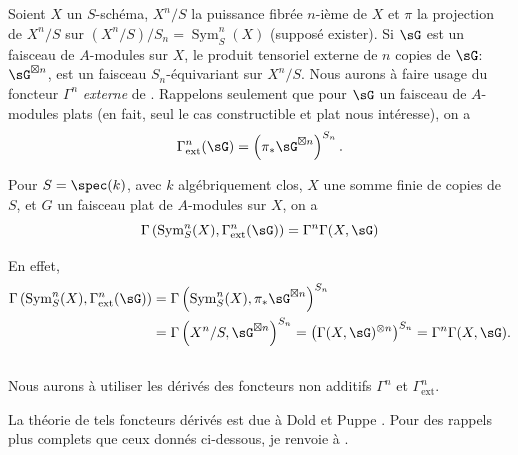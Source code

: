 \subsection{}\label{III:1-2}

Soient $X$ un $S$-schéma, $X^n/S$ la puissance fibrée $n$-ième de $X$ et 
$\pi$ la projection de $X^n/S$ sur $(X^n/S)/S_n=\operatorname{Sym}_S^n(X)$ 
(supposé exister). Si $\sG$ est un faisceau de $A$-modules sur $X$, le 
produit tensoriel externe de $n$ copies de $\sG$: $\sG^{\boxtimes n}$, est un 
faisceau $S_n$-équivariant sur $X^n/S$. Nous aurons à faire usage du 
foncteur $\Gamma^n$ \emph{externe} de . Rappelons 
seulement que pour $\sG$ un faisceau de $A$-modules plats (en fait, seul le cas 
constructible et plat nous intéresse), on a 
\[
  \Gamma_\text{ext}^n(\sG) = \left(\pi_*\sG^{\boxtimes n}\right)^{S_n} \text{.}
\]





\begin{lemma_}\label{III:1-3}
Pour $S=\spec(k)$, avec $k$ algébriquement clos, $X$ une somme finie de 
copies de $S$, et $G$ un faisceau plat de $A$-modules sur $X$, on a 
\[
  \Gamma\left(\operatorname{Sym}_S^n(X),\Gamma_\text{ext}^n(\sG)\right) = \Gamma^n \Gamma(X,\sG)
\]
\end{lemma_}

En effet, 
\begin{align*}
  \Gamma\left(\operatorname{Sym}_S^n(X),\Gamma_\text{ext}^n(\sG)\right) 
    &= \Gamma\left(\operatorname{Sym}_S^n(X),\pi_*\sG^{\boxtimes n}\right)^{S_n} \\
    &= \Gamma\left(X^n/S,\sG^{\boxtimes n}\right)^{S_n} 
    = \left(\Gamma(X,\sG)^{\otimes n}\right)^{S_n} 
    = \Gamma^n \Gamma(X,\sG) \text{.}
\end{align*}





\subsection{}\label{III:1-4}

Nous aurons à utiliser les dérivés des foncteurs non additifs $\Gamma^n$ 
et $\Gamma_\text{ext}^n$. 

La théorie de tels foncteurs dérivés est due à Dold et Puppe 
. Pour des rappels plus complets que ceux donnés ci-dessous, je 
renvoie à . 

